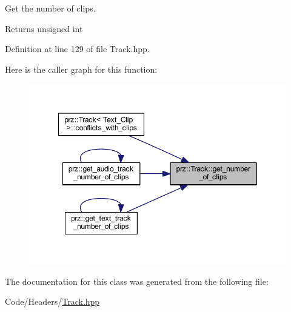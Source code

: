 Get the number of clips. 

\begin{DoxyReturn}{Returns}
unsigned int 
\end{DoxyReturn}


Definition at line 129 of file Track.\+hpp.

Here is the caller graph for this function\+:
\nopagebreak
\begin{figure}[H]
\begin{center}
\leavevmode
\includegraphics[width=349pt]{classprz_1_1_track_a776b6d37978d945f406fc4922981a2a1_icgraph}
\end{center}
\end{figure}


The documentation for this class was generated from the following file\+:\begin{DoxyCompactItemize}
\item 
Code/\+Headers/\mbox{\hyperlink{_track_8hpp}{Track.\+hpp}}\end{DoxyCompactItemize}
